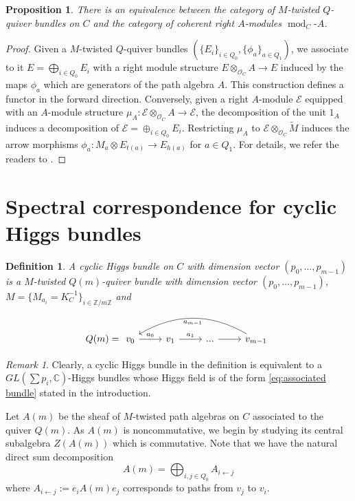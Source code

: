 \documentclass[11pt]{amsart}
\theoremstyle{plain}
\newtheorem{definition}[theorem]{Definition}
\newtheorem{prop}[theorem]{Proposition}
\theoremstyle{definition}
\theoremstyle{remark}
\newtheorem{rem}[theorem]{Remark}
\def\Z{\mathbb{Z}}
\def\C{\mathbb{C}}
\def\O{\mathcal{O}}
\def\m{\mu}
\def\m{\mathcal}
\def\mod{\operatorname{mod}}
\begin{document}
\begin{prop}\label{prop:equiv1}
There is an equivalence between the category of $M$-twisted $Q$-quiver bundles on $C$ and the category of coherent right $A$-modules $\mod_C\!\text{-}A$.
\end{prop}
\begin{proof}
    Given a $M$-twisted $Q$-quiver bundles $(\{E_i\}_{i\in Q_0},\{\phi_a\}_{a\in Q_1})$, we associate to it $E = \bigoplus_{i\in Q_0} E_i$ with a right module structure $E\otimes_{\O_C} A\to E$ induced by the maps $\phi_a$ which are generators of the path algebra $A$. This construction defines a functor in the forward direction. Conversely, given a right $A$-module $\m E$ equipped with an $A$-module structure $\mu_A: \m E\otimes_{\O_C}A\to \m E$, the decomposition of the unit $1_A$ induces a decomposition of $\m E = \oplus _{i\in Q_0}E_i$. Restricting $\mu_A$ to $\m E\otimes_{\O_C} \widetilde{M}$ induces the arrow morphisms $\phi_a: M_a\otimes E_{t(a)} \to E_{h(a)}$ for $a\in Q_1$.  For details, we refer the readers to \cite[Proposition 5.2]{CGP}. 
\end{proof}


\section{Spectral correspondence for cyclic Higgs bundles}
\begin{definition}
                    A cyclic Higgs bundle on $C$ with dimension vector $(p_0,\dots,p_{m-1})$ is a $M$-twisted $Q(m)$-quiver bundle with dimension vector $(p_0,\dots,p_{m-1})$, $M=\{M_{a_i} = K_C^{-1}\}_{i\in \Z/m\Z}$ and 
                    \begin{equation*}
                        Q(m)= 
                    \begin{tikzcd}
              v_0\arrow[r,"a_0"]&v_1\arrow[r,"a_1"]&... \arrow[r]&v_{m-1}\arrow[lll,bend right,"a_{m-1}"]
                    \end{tikzcd}
            \end{equation*}
                \end{definition}
\begin{rem}
Clearly, a cyclic Higgs bundle in the definition is equivalent to a $GL(\sum p_i, \C)$-Higgs bundles whose Higgs field is of the form \ref{eq:associated bundle} stated in the introduction. 
\end{rem}

               
            
    Let $A(m)$ be the sheaf of $M$-twisted path algebras on $C$ associated to the quiver $Q(m)$. As $A(m)$ is noncommutative, we begin by studying its central subalgebra $Z(A(m))$ which is commutative. Note that we have the natural direct sum decomposition
                \begin{equation}\label{path decomposition}
                    A(m) = \bigoplus_{ i,j\in Q_0}A_{i\leftarrow j}
                \end{equation}
      where $A_{i\leftarrow j}:= e_iA(m)e_j$ corresponds to paths from $v_j$ to $v_i$. 
\end{document}
